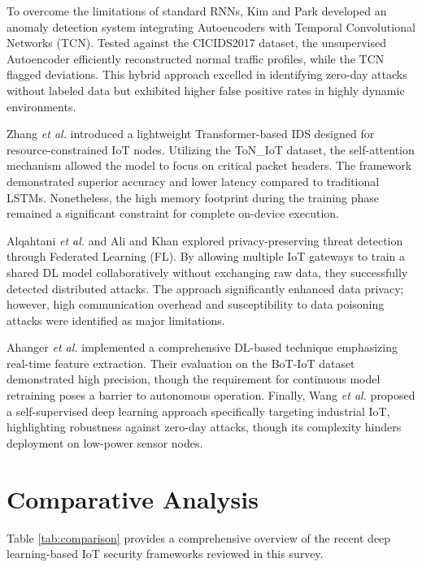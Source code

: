 \documentclass[conference]{IEEEtran}
\begin{document}
To overcome the limitations of standard RNNs, Kim and Park \cite{kim2023} developed an anomaly detection system integrating Autoencoders with Temporal Convolutional Networks (TCN). Tested against the CICIDS2017 dataset, the unsupervised Autoencoder efficiently reconstructed normal traffic profiles, while the TCN flagged deviations. This hybrid approach excelled in identifying zero-day attacks without labeled data but exhibited higher false positive rates in highly dynamic environments.

Zhang \textit{et al.} \cite{zhang2022} introduced a lightweight Transformer-based IDS designed for resource-constrained IoT nodes. Utilizing the ToN\_IoT dataset, the self-attention mechanism allowed the model to focus on critical packet headers. The framework demonstrated superior accuracy and lower latency compared to traditional LSTMs. Nonetheless, the high memory footprint during the training phase remained a significant constraint for complete on-device execution.

Alqahtani \textit{et al.} \cite{alqahtani2022} and Ali and Khan \cite{ali2024} explored privacy-preserving threat detection through Federated Learning (FL). By allowing multiple IoT gateways to train a shared DL model collaboratively without exchanging raw data, they successfully detected distributed attacks. The approach significantly enhanced data privacy; however, high communication overhead and susceptibility to data poisoning attacks were identified as major limitations.

Ahanger \textit{et al.} \cite{ahanger2024} implemented a comprehensive DL-based technique emphasizing real-time feature extraction. Their evaluation on the BoT-IoT dataset demonstrated high precision, though the requirement for continuous model retraining poses a barrier to autonomous operation. Finally, Wang \textit{et al.} \cite{wang2025} proposed a self-supervised deep learning approach specifically targeting industrial IoT, highlighting robustness against zero-day attacks, though its complexity hinders deployment on low-power sensor nodes.

\section{Comparative Analysis}
Table \ref{tab:comparison} provides a comprehensive overview of the recent deep learning-based IoT security frameworks reviewed in this survey.
\end{document}
